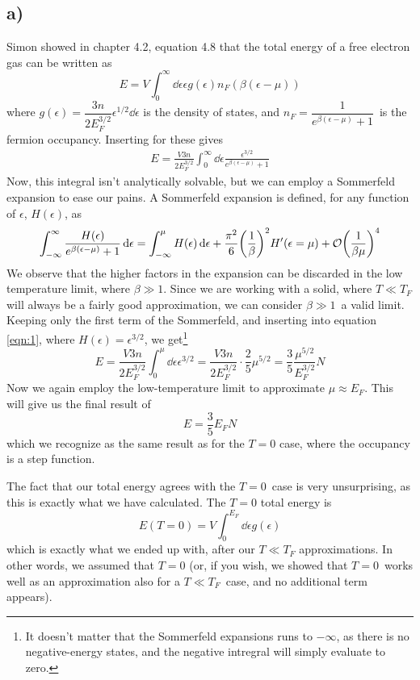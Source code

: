 \documentclass[12p,a4paper]{article}
\renewcommand{\exp}{e^}
\renewcommand{\exp}{e^}
\begin{document}
\subsection*{a)}
Simon showed in chapter 4.2, equation 4.8 that the total energy of a free electron gas can be written as
\[
    E = V\int_0^\infty \dd{\epsilon} \epsilon g(\epsilon) n_F(\beta(\epsilon - \mu))
\]
where $g(\epsilon) = \dfrac{3n}{2E_F^{3/2}}\epsilon^{1/2}\dd{\epsilon}$ is the density of states, and $n_F = \dfrac{1}{\exp{\beta(\epsilon - \mu)} + 1}$ is the fermion occupancy. Inserting for these gives
\begin{align}\label{eqn:1}
    E = \frac{V3n}{2E_F^{3/2}} \int_0^\infty \dd{\epsilon} \frac{\epsilon^{3/2}}{\exp{\beta(\epsilon - \mu)} + 1}
\end{align}
Now, this integral isn't analytically solvable, but we can employ a Sommerfeld expansion to ease our pains. A Sommerfeld expansion is defined, for any function of $\epsilon$, $H(\epsilon)$, as
\[
    \int_{-\infty}^\infty \frac{H(\epsilon)}{\exp{\beta(\epsilon - \mu)} + 1}\dd{\epsilon} = \int_{-\infty}^\mu H(\epsilon) \dd{\epsilon} + \frac{\pi^2}{6}\qty(\frac{1}{\beta})^2 H'(\epsilon=\mu) + \mathcal{O}\qty(\frac{1}{\beta\mu})^4
\]
We observe that the higher factors in the expansion can be discarded in the low temperature limit, where $\beta \gg 1$. Since we are working with a solid, where $T \ll T_F$ will always be a fairly good approximation, we can consider $\beta \gg 1$ a valid limit. Keeping only the first term of the Sommerfeld, and inserting into equation \ref{eqn:1}, where $H(\epsilon) = \epsilon^{3/2}$, we get\footnote{It doesn't matter that the Sommerfeld expansions runs to $-\infty$, as there is no negative-energy states, and the negative intregral will simply evaluate to zero.}
\[
    E = \frac{V3n}{2E_F^{3/2}} \int_0^\mu \dd{\epsilon} \epsilon^{3/2} = \frac{V3n}{2E_F^{3/2}} \cdot \frac{2}{5}\mu^{5/2} = \frac{3}{5} \frac{\mu^{5/2}}{E_F^{3/2}} N
\]
Now we again employ the low-temperature limit to approximate $\mu \approx E_F$. This will give us the final result of
\[
    E = \frac{3}{5}E_F N
\]
which we recognize as the same result as for the $T=0$ case, where the occupancy is a step function.

The fact that our total energy agrees with the $T=0$ case is very unsurprising, as this is exactly what we have calculated. The $T=0$ total energy is
\[
    E(T=0) = V\int_0^{E_F} \dd{\epsilon} g(\epsilon)
\]
which is exactly what we ended up with, after our $T\ll T_F$ approximations. In other words, we assumed that $T=0$ (or, if you wish, we showed that $T=0$ works well as an approximation also for a $T \ll T_F$ case, and no additional term appears).
\end{document}
